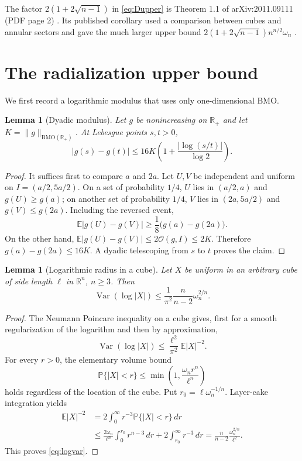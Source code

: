\documentclass[11pt]{article}
\newtheorem{lemma}[theorem]{Lemma}
\newcommand{\R}{\mathbb R}
\newcommand{\BMO}{\mathrm{BMO}}
\newcommand{\osc}{\mathcal O}
\newcommand{\E}{\mathbb E}
\newcommand{\1}{\mathbf 1}
\begin{document}
The factor $2(1+2\sqrt{n-1})$ in \eqref{eq:Dupper} is Theorem 1.1 of
arXiv:2011.09111 (PDF page 2) \cite{bounds}.  Its published corollary used a
comparison between cubes and annular sectors and gave the much larger upper
bound
$2(1+2\sqrt{n-1})n^{n/2}\omega_n$ \cite[PDF pp.~3--4]{bounds}.

\section{The radialization upper bound}

We first record a logarithmic modulus that uses only one-dimensional BMO.

\begin{lemma}[Dyadic modulus]\label{lem:dyadic}
Let $g$ be nonincreasing on $\R_+$ and let
$K=\|g\|_{\BMO(\R_+)}$.  At Lebesgue points $s,t>0$,
\[
 |g(s)-g(t)|\le 16K\left(1+\frac{|\log(s/t)|}{\log2}\right).
\]
\end{lemma}

\begin{proof}
It suffices first to compare $a$ and $2a$.  Let $U,V$ be independent and
uniform on $I=(a/2,5a/2)$.  On a set of probability $1/4$, $U$ lies in
$(a/2,a)$ and $g(U)\ge g(a)$; on another set of probability $1/4$, $V$
lies in $(2a,5a/2)$ and $g(V)\le g(2a)$.  Including the reversed event,
\[
 \E|g(U)-g(V)|\ge\frac18\bigl(g(a)-g(2a)\bigr).
\]
On the other hand,
$\E|g(U)-g(V)|\le2\osc(g,I)\le2K$.  Therefore
$g(a)-g(2a)\le16K$.  A dyadic telescoping from $s$ to $t$ proves the
claim.
\end{proof}

\begin{lemma}[Logarithmic radius in a cube]\label{lem:logradius}
Let $X$ be uniform in an arbitrary cube of side length $\ell$ in $\R^n$,
$n\ge3$.  Then
\begin{equation}\label{eq:logvar}
 \operatorname{Var}(\log|X|)
 \le \frac1{\pi^2}\frac n{n-2}\omega_n^{2/n}.
\end{equation}
\end{lemma}

\begin{proof}
The Neumann Poincare inequality on a cube gives, first for a smooth
regularization of the logarithm and then by approximation,
\[
 \operatorname{Var}(\log|X|)
 \le\frac{\ell^2}{\pi^2}\E|X|^{-2}.
\]
For every $r>0$, the elementary volume bound
\[
 \mathbb P\{|X|<r\}\le
 \min\left(1,\frac{\omega_n r^n}{\ell^n}\right)
\]
holds regardless of the location of the cube.  Put
$r_0=\ell\omega_n^{-1/n}$.  Layer-cake integration yields
\begin{align*}
 \E|X|^{-2}
 &=2\int_0^\infty r^{-3}\mathbb P\{|X|<r\}\,dr\\
 &\le \frac{2\omega_n}{\ell^n}\int_0^{r_0}r^{n-3}\,dr
       +2\int_{r_0}^\infty r^{-3}\,dr
 =\frac n{n-2}\frac{\omega_n^{2/n}}{\ell^2}.
\end{align*}
This proves \eqref{eq:logvar}.
\end{proof}
\end{document}
